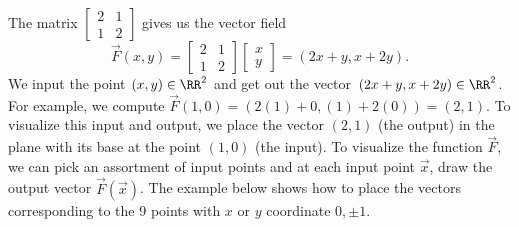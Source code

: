 \begin{example}
The matrix $\begin{bmatrix}2&1\\1&2\end{bmatrix}$ gives us the vector field $$\vec F(x,y)=\begin{bmatrix}2&1\\1&2\end{bmatrix}\begin{bmatrix}x\\y\end{bmatrix}=(2x+y,x+2y).$$ We input the point $(x,y)\in {\RR}^2$ and get out the vector $(2x+y,x+2y)\in {\RR}^2$.  For example, we compute $\vec F(1,0) = (2(1)+0,(1)+2(0)) = (2,1)$. To visualize this input and output, we place the vector $(2,1)$ (the output) in the plane with its base at the point $(1,0)$ (the input). To visualize the function $\vec F$, we can pick an assortment of input points and at each input point $\vec x$, draw the output vector $\vec F(\vec x)$.  The example below shows how to place the vectors corresponding to the 9 points with $x$ or $y$ coordinate $0, \pm 1$.  

\begin{center}
\end{center}



\end{example}
